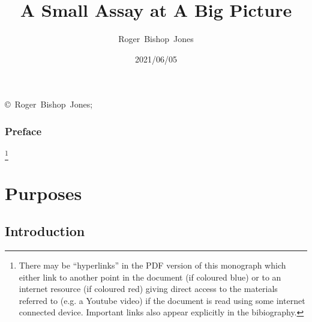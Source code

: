 \documentclass[10pt,titlepage]{book}
\title{\LARGE\bf A Small Assay at A Big Picture}
\author{Roger~Bishop~Jones}
\date{\small 2021/06/05}
\begin{document}
\frontmatter

                               
\begin{titlepage}
\maketitle


\begin{centering}

{\footnotesize
\copyright\ Roger~Bishop~Jones;
}%

\end{centering}

\end{titlepage}

\setcounter{tocdepth}{2}

{\parskip-0pt\tableofcontents}

\mainmatter


\pagebreak

\section*{Preface}


\footnote{There may be ``hyperlinks'' in the PDF version of this monograph which either link to another point in the document  (if coloured blue) or to an internet resource  (if coloured red) giving direct access to the materials referred to (e.g. a Youtube video) if the document is read using some internet connected device.
Important links also appear explicitly in the bibiography.}

\part{Purposes}

\chapter{Introduction}
\end{document}
